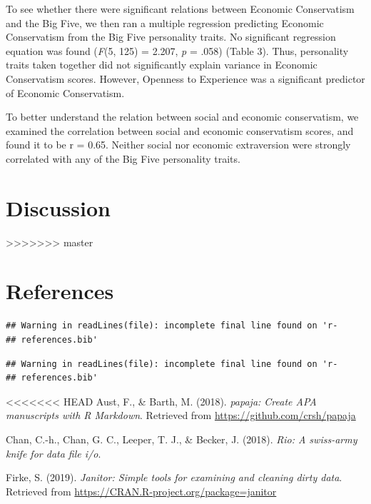 \documentclass[man]{apa6}
\begin{document}
To see whether there were significant relations between Economic Conservatism and the Big Five, we then ran a multiple regression predicting Economic Conservatism from the Big Five personality traits. No significant regression equation was found (\emph{F}(5, 125) = 2.207, \emph{p} = .058) (Table 3). Thus, personality traits taken together did not significantly explain variance in Economic Conservatism scores. However, Openness to Experience was a significant predictor of Economic Conservatism.

To better understand the relation between social and economic conservatism, we examined the correlation between social and economic conservatism scores, and found it to be r = 0.65. Neither social nor economic extraversion were strongly correlated with any of the Big Five personality traits.

\hypertarget{discussion}{%
\section{Discussion}\label{discussion}}
>>>>>>> master

\newpage

\hypertarget{references}{%
\section{References}\label{references}}

\begin{verbatim}
## Warning in readLines(file): incomplete final line found on 'r-
## references.bib'
\end{verbatim}

\begin{verbatim}
## Warning in readLines(file): incomplete final line found on 'r-
## references.bib'
\end{verbatim}

\begingroup
\setlength{\parindent}{-0.5in}
\setlength{\leftskip}{0.5in}

\hypertarget{refs}{}
<<<<<<< HEAD
\hypertarget{ref-R-papaja}{}
Aust, F., \& Barth, M. (2018). \emph{papaja: Create APA manuscripts with
R Markdown}. Retrieved from \url{https://github.com/crsh/papaja}

\hypertarget{ref-R-rio}{}
Chan, C.-h., Chan, G. C., Leeper, T. J., \& Becker, J. (2018).
\emph{Rio: A swiss-army knife for data file i/o}.

\hypertarget{ref-R-janitor}{}
Firke, S. (2019). \emph{Janitor: Simple tools for examining and cleaning
dirty data}. Retrieved from
\url{https://CRAN.R-project.org/package=janitor}
\end{document}
